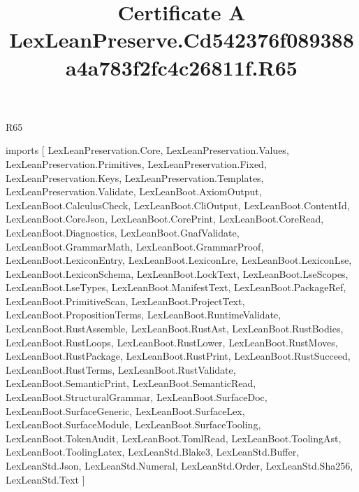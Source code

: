 \begin{lexlean}{R65}
\title{Certificate A LexLeanPreserve.Cd542376f089388a4a783f2fc4c26811f.R65}
\begin{coremodule}
imports [
  LexLeanPreservation.Core,
  LexLeanPreservation.Values,
  LexLeanPreservation.Primitives,
  LexLeanPreservation.Fixed,
  LexLeanPreservation.Keys,
  LexLeanPreservation.Templates,
  LexLeanPreservation.Validate,
  LexLeanBoot.AxiomOutput,
  LexLeanBoot.CalculusCheck,
  LexLeanBoot.CliOutput,
  LexLeanBoot.ContentId,
  LexLeanBoot.CoreJson,
  LexLeanBoot.CorePrint,
  LexLeanBoot.CoreRead,
  LexLeanBoot.Diagnostics,
  LexLeanBoot.GnafValidate,
  LexLeanBoot.GrammarMath,
  LexLeanBoot.GrammarProof,
  LexLeanBoot.LexiconEntry,
  LexLeanBoot.LexiconLre,
  LexLeanBoot.LexiconLse,
  LexLeanBoot.LexiconSchema,
  LexLeanBoot.LockText,
  LexLeanBoot.LseScopes,
  LexLeanBoot.LseTypes,
  LexLeanBoot.ManifestText,
  LexLeanBoot.PackageRef,
  LexLeanBoot.PrimitiveScan,
  LexLeanBoot.ProjectText,
  LexLeanBoot.PropositionTerms,
  LexLeanBoot.RuntimeValidate,
  LexLeanBoot.RustAssemble,
  LexLeanBoot.RustAst,
  LexLeanBoot.RustBodies,
  LexLeanBoot.RustLoops,
  LexLeanBoot.RustLower,
  LexLeanBoot.RustMoves,
  LexLeanBoot.RustPackage,
  LexLeanBoot.RustPrint,
  LexLeanBoot.RustSucceed,
  LexLeanBoot.RustTerms,
  LexLeanBoot.RustValidate,
  LexLeanBoot.SemanticPrint,
  LexLeanBoot.SemanticRead,
  LexLeanBoot.StructuralGrammar,
  LexLeanBoot.SurfaceDoc,
  LexLeanBoot.SurfaceGeneric,
  LexLeanBoot.SurfaceLex,
  LexLeanBoot.SurfaceModule,
  LexLeanBoot.SurfaceTooling,
  LexLeanBoot.TokenAudit,
  LexLeanBoot.TomlRead,
  LexLeanBoot.ToolingAst,
  LexLeanBoot.ToolingLatex,
  LexLeanStd.Blake3,
  LexLeanStd.Buffer,
  LexLeanStd.Json,
  LexLeanStd.Numeral,
  LexLeanStd.Order,
  LexLeanStd.Sha256,
  LexLeanStd.Text
]


\end{coremodule}
\end{lexlean}
